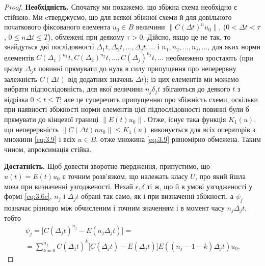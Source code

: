 \begin{proof}
    \textbf{Необхідність.} Спочатку ми покажемо, що збіжна схема необхідно є стійкою. Ми cтверджуємо, що для всякої збіжної схеми й для довільного початкового фіксованого елемента $u_0 \in B$ величини $\|C(\Delta t)^n u_0\|$, ($0 < \Delta t < \tau$, $0 \le n \Delta t \le T$), обмежені при деякому $\tau > 0$. Дійсно, якщо це не так, то знайдуться дві послідовності $\Delta_1 t, \Delta_2 t, \ldots, \Delta_j t, \ldots$ і $n_1, n_2, \ldots, n_j, \ldots$, для яких норми елементів $C(\Delta_1)^{n_1} t, C(\Delta_2)^{n_2} t, \ldots, C(\Delta_j)^{n_j} t, \ldots$ необмежено зростають (при цьому $\Delta_j t$ повинні прямувати до нуля в силу припущення про неперервну залежність $C(\Delta t)$ від додатних значень $\Delta t$); із цих елементів ми можемо вибрати підпослідовність, для якої величини $n_j \delta_j t$ збігаються до деякого $t$ з відрізка  $0 \le t \le T$; але це суперечить припущенню про збіжність схеми, оскільки при наявності збіжності норми елементів цієї підпослідовності повинні були б прямувати до кінцевої границі $\|E(t)u_0\|$. Отже, існує така функція $K_1(u)$, що неперервність $\|C(\Delta t) n u_0\| \le K_1(u)$ виконується для всіх операторів з множини \eqref{eq:3.9} і всіх $u \in B$, отже множина \eqref{eq:3.9} рівномірно обмежена. Таким чином, апроксимація стійка. \medskip

    \textbf{Достатність.} Щоб довести зворотне твердження, припустимо, що $u(t) = E(t)u_0$ є точним розв'язком, що належать класу $U$, про який йшла мова при визначенні узгодженості. Нехай  $\epsilon, \delta$ ті ж, що й в умові узгодженості у формі \eqref{eq:3.6c}, $n_j$ і $\Delta_j t$ обрані так само, як і при визначенні збіжності, а $\psi_j$ позначає різницю між обчисленим і точним значенням і в момент часу  $n_j \Delta_j t$, тобто
    \begin{multline}
        \label{eq:3.10}
        \psi_j = \Big[ C(\Delta_j t)^{n_j} - E(n_j \Delta_j t) \Big] = \\
        = \sum_{k = 0}^{n_j} C(\Delta_j t)^k \Big[ C(\Delta_j t) - E(\Delta_j t) \Big] E((n_j - 1 - k) \Delta_j t) u_0.
    \end{multline}
    

\end{proof}
